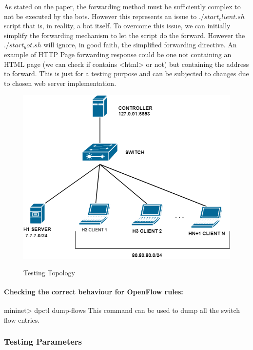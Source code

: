 As stated on the paper, the forwarding method must be sufficiently complex to not be executed by the bots. However this represents an issue to $./start_client.sh$ script that is, in reality, a bot itself. To overcome this issue, we can initially simplify the forwarding mechanism to let the script do the forward. However the $./start_bot.sh$ will ignore, in good faith, the simplified forwarding directive.
An example of HTTP Page forwarding response could be one not containing an HTML page (we can check if contains <html> or not) but containing the address to forward. This is just for a testing purpose and can be subjected to changes due to chosen web server implementation.

\begin{figure}[H]
\begin{center}
\includegraphics[]{../images/TestingTopology.png}
\label{fig:testing}
\caption{Testing Topology}
\end{center}
\end{figure}

\paragraph{Checking the correct behaviour for OpenFlow rules:} 
mininet> dpctl dump-flows
This command can be used to dump all the switch flow entries.

\subsubsection{Testing Parameters}

